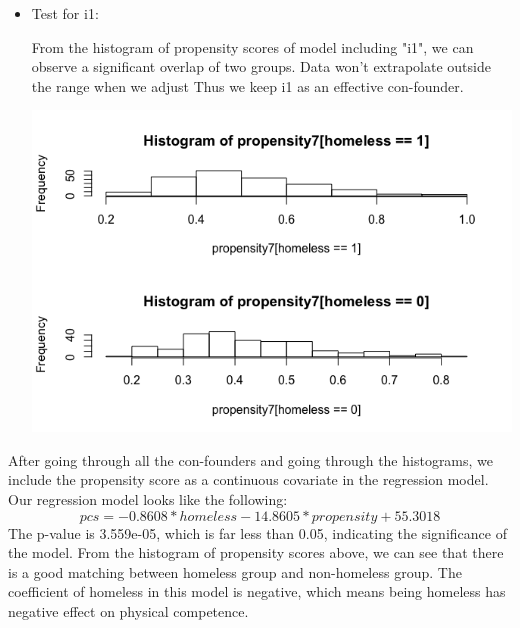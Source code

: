 \documentclass{report}
\begin{document}
\begin{itemize}
\begin{minipage}{0.5\linewidth}
    \end{minipage}
    \item Test for i1:\\
    \begin{minipage}{0.5\linewidth}
        From the histogram of propensity scores of model including "i1", we can observe a significant overlap of two groups. Data won't extrapolate outside the range when we adjust Thus we keep i1 as an effective con-founder.  
    \end{minipage}
    \begin{minipage}{0.5\linewidth}
        \centering
        \includegraphics[scale=0.25]{8.png}
    \end{minipage}
\end{itemize}
After going through all the con-founders and going through the histograms, we include the propensity score as a continuous covariate in the regression model. Our regression model looks like the following:
\[pcs = -0.8608 * homeless - 14.8605 * propensity + 55.3018\]
The p-value is 3.559e-05, which is far less than 0.05, indicating the significance of the model. From the histogram of propensity scores above, we can see that there is a good matching between homeless group and non-homeless group. The coefficient of homeless in this model is negative, which means being homeless has negative effect on physical competence. 
\end{document}
